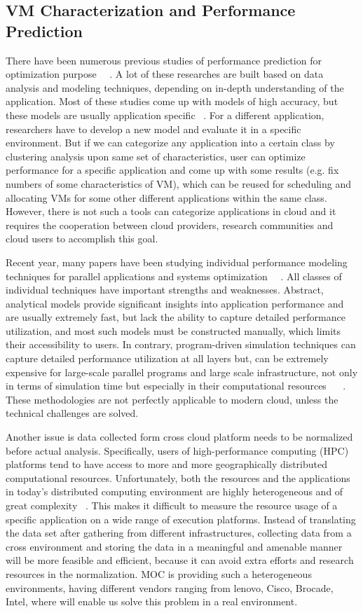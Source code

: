 \subsection{VM Characterization and Performance Prediction}
There have been numerous previous studies of performance prediction for optimization purpose~\cite{Yang2005} ~\cite{Matsunaga2010}. A lot of these researches are built based on data analysis and modeling techniques, depending on in-depth understanding of the application. Most of these studies come up with models of high accuracy, but these models are usually application specific ~\cite{Shan2008}. For a different application, researchers have to develop a new model and evaluate it in a specific environment. But if we can categorize any application into a certain class by clustering analysis upon same set of characteristics, user can optimize performance for a specific application and come up with some results (e.g. fix numbers of some characteristics of VM), which can be reused for scheduling and allocating VMs for some other different applications within the same class. However, there is not such a tools can categorize applications in cloud and it requires the cooperation between cloud providers, research communities and cloud users to accomplish this goal.

Recent year, many papers have been studying individual performance modeling techniques for parallel applications and systems optimization ~\cite{Brian98}~\cite{Yang2005}. All classes of individual techniques have important strengths and weaknesses. Abstract, analytical models provide significant insights into application performance and are usually extremely fast, but lack the ability to capture detailed performance utilization, and most such models must be constructed manually, which limits their accessibility to users. In contrary, program-driven simulation techniques can capture detailed performance utilization at all layers but, can be extremely expensive for large-scale parallel programs and large scale infrastructure, not only in terms of simulation time but especially in their computational resources ~\cite{Huaxia1999} ~\cite{Michael2015}. These methodologies are not perfectly applicable to modern cloud, unless the technical challenges are solved.

Another issue is data collected form cross cloud platform needs to be normalized before actual analysis. Specifically, users of high-performance computing (HPC) platforms tend to have access to more and more geographically distributed computational resources. Unfortunately, both the resources and the applications in today’s distributed computing environment are highly heterogeneous and of great complexity ~\cite{Yang2005}. This makes it difficult to measure the resource usage of a specific application on a wide range of execution platforms. Instead of translating the data set after gathering from different infrastructures, collecting data from a cross environment and storing the data in a meaningful and amenable manner will be more feasible and efficient, because it can avoid extra efforts and research resources in the normalization. MOC is providing such a heterogeneous environments, having different vendors ranging from lenovo, Cisco, Brocade, Intel, where will enable us solve this problem in a real environment.